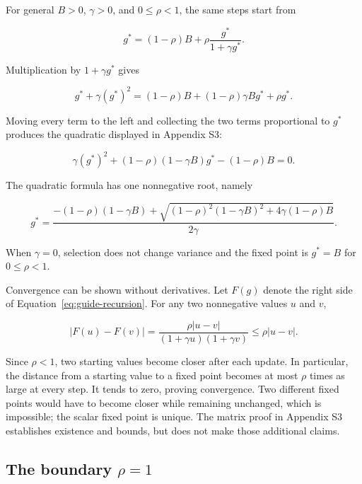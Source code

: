 \documentclass[11pt]{article}
\begin{document}
For general $B>0$, $\gamma>0$, and $0\leq\rho<1$, the same steps start from

\nopagebreak[4]
\begin{equation}
g^*=(1-\rho)B+\rho\frac{g^*}{1+\gamma g^*}.
\end{equation}

Multiplication by $1+\gamma g^*$ gives

\begin{equation}
g^*+\gamma(g^*)^2
=(1-\rho)B+(1-\rho)\gamma B g^*+\rho g^*.
\end{equation}

Moving every term to the left and collecting the two terms proportional to
$g^*$ produces the quadratic displayed in Appendix S3:

\begin{equation}
\gamma(g^*)^2+(1-\rho)(1-\gamma B)g^*-(1-\rho)B=0.
\label{eq:guide-general-fixedpoint-quadratic}
\end{equation}

The quadratic formula has one nonnegative root, namely

\begin{equation}
g^*=\frac{-(1-\rho)(1-\gamma B)
+\sqrt{(1-\rho)^2(1-\gamma B)^2+4\gamma(1-\rho)B}}
{2\gamma}.
\label{eq:guide-scalar-root}
\end{equation}

When $\gamma=0$, selection does not change variance and the fixed point is
$g^*=B$ for $0\leq\rho<1$.

Convergence can be shown without derivatives.  Let $F(g)$ denote the right
side of Equation~\eqref{eq:guide-recursion}.  For any two nonnegative values
$u$ and $v$,

\begin{equation}
|F(u)-F(v)|
=\frac{\rho|u-v|}{(1+\gamma u)(1+\gamma v)}
\leq\rho|u-v|.
\label{eq:guide-contraction}
\end{equation}

Since $\rho<1$, two starting values become closer after each update. In particular, the distance from a starting value to a fixed point becomes at most $\rho$ times as large at every step. It tends to zero, proving convergence. Two different fixed points would have to become closer while remaining unchanged, which is impossible; the scalar fixed point is unique. The matrix proof in Appendix S3 establishes existence and bounds, but does not make those additional claims.

\subsection{The boundary \texorpdfstring{$\rho=1$}{rho = 1}}
\end{document}
